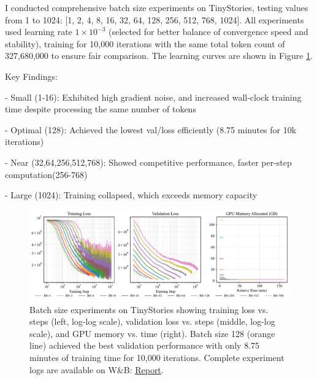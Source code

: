\begin{answer}
I conducted comprehensive batch size experiments on TinyStories, testing values from 1 to 1024: [1, 2, 4, 8, 16, 32, 64, 128, 256, 512, 768, 1024]. All experiments used learning rate $1 \times 10^{-3}$ (selected for better balance of convergence speed and stability), training for 10,000 iterations with the same total token count of 327,680,000 to ensure fair comparison. The learning curves are shown in Figure \ref{fig:batch_size_experiments}.

Key Findings:

- {Small (1-16)}: Exhibited high gradient noise, and increased wall-clock training time despite processing the same number of tokens

- {Optimal (128)}: Achieved the lowest val/loss efficiently (8.75 minutes for 10k iterations)

- {Near (32,64,256,512,768)}: Showed competitive performance, faster per-step computation(256-768)

- {Large (1024)}: Training collapsed, which exceeds memory capacity

\begin{figure}[!htb]
    \centering
    \includegraphics[width=\textwidth]{images/batch_size_experiments.pdf}
    \caption{Batch size experiments on TinyStories showing training loss vs. steps (left, log-log scale), validation loss vs. steps (middle, log-log scale), and GPU memory vs. time (right). Batch size 128 (orange line) achieved the best validation performance with only 8.75 minutes of training time for 10,000 iterations. Complete experiment logs are available on W\&B: \href{https://wandb.ai/donglinkang2021-beijing-institute-of-technology/cs336-assignment1-basics/reports/Batch-size-variations--VmlldzoxNDY5Mzc1OQ?accessToken=5hohvd95f5ejp1e2cn3wt8x2ysqrkgmou352yx2axyiu3ho2fibb3g1bugj39zdx}{Report}.}
    \label{fig:batch_size_experiments}
\end{figure}

\end{answer}

